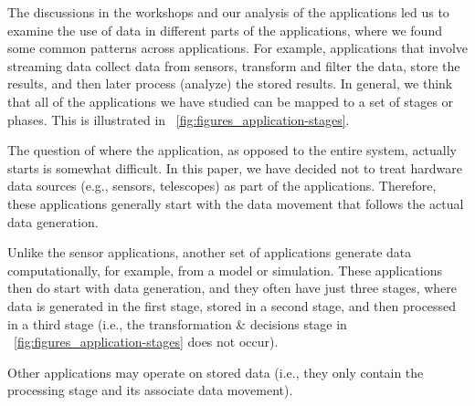 

The discussions in the workshops and our analysis of the applications
led us to examine the use of data in different parts of the
applications, where we found some common patterns
across applications.  For example, applications that involve
streaming data collect data from sensors, transform and
filter the data, store the results, and then later process (analyze)
the stored results.  In general, we think that all of the applications
we have studied can be mapped to a set of stages or phases.  This is
illustrated in \figurename~\ref{fig:figures_application-stages}.

The question of where the application, as opposed to the entire
system, %
actually starts
is somewhat difficult.  In this paper, we have decided not to treat
hardware data sources (e.g., sensors, telescopes) as part of the
applications.  Therefore, these applications generally start with the
data movement that follows the actual data generation.

Unlike the sensor applications, another set of applications generate
data computationally, for example, from a model or simulation.  These
applications then do start with data generation, and they often have
just three stages, where data is generated in the first stage, stored
in a second stage, and then processed in a third stage (i.e., the
transformation \& decisions stage in
\figurename~\ref{fig:figures_application-stages} does not occur).

Other
applications may operate on stored data (i.e., they only contain the
processing stage and its associate data movement).

